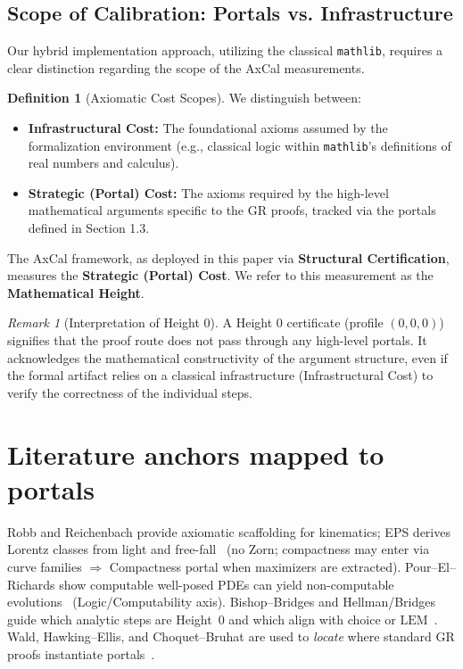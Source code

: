 \documentclass[11pt]{article}
\theoremstyle{definition}
\newtheorem{definition}[theorem]{Definition}
\theoremstyle{remark}
\newtheorem{remark}[theorem]{Remark}
\newcommand{\LEM}{\mathrm{LEM}}
\begin{document}
\subsection{Scope of Calibration: Portals vs. Infrastructure}
Our hybrid implementation approach, utilizing the classical \texttt{mathlib}, requires a clear distinction regarding the scope of the AxCal measurements.

\begin{definition}[Axiomatic Cost Scopes]
We distinguish between:
\begin{itemize}
    \item \textbf{Infrastructural Cost:} The foundational axioms assumed by the formalization environment (e.g., classical logic within \texttt{mathlib}'s definitions of real numbers and calculus).
    \item \textbf{Strategic (Portal) Cost:} The axioms required by the high-level mathematical arguments specific to the GR proofs, tracked via the portals defined in Section 1.3.
\end{itemize}
\end{definition}

The AxCal framework, as deployed in this paper via \textbf{Structural Certification}, measures the \textbf{Strategic (Portal) Cost}. We refer to this measurement as the \textbf{Mathematical Height}.

\begin{remark}[Interpretation of Height 0]
A Height 0 certificate (profile $(0,0,0)$) signifies that the proof route does not pass through any high-level portals. It acknowledges the mathematical constructivity of the argument structure, even if the formal artifact relies on a classical infrastructure (Infrastructural Cost) to verify the correctness of the individual steps.
\end{remark}

\section{Literature anchors mapped to portals}
Robb and Reichenbach provide axiomatic scaffolding for kinematics; EPS derives Lorentz classes from light and free-fall~\cite{Robb1914,Reichenbach1969,EPS1972} (no Zorn; compactness may enter via curve families $\Rightarrow$ Compactness portal when maximizers are extracted). Pour--El--Richards show computable well-posed PDEs can yield non-computable evolutions~\cite{PourElRichards1989} (Logic/Computability axis). Bishop--Bridges and Hellman/Bridges guide which analytic steps are Height~0 and which align with choice or $\LEM$~\cite{BishopBridges1985,Hellman1998,BridgesReply1995}. Wald, Hawking--Ellis, and Choquet--Bruhat are used to \emph{locate} where standard GR proofs instantiate portals~\cite{Wald1984,HawkingEllis1973,ChoquetBruhat2009}.
\end{document}
